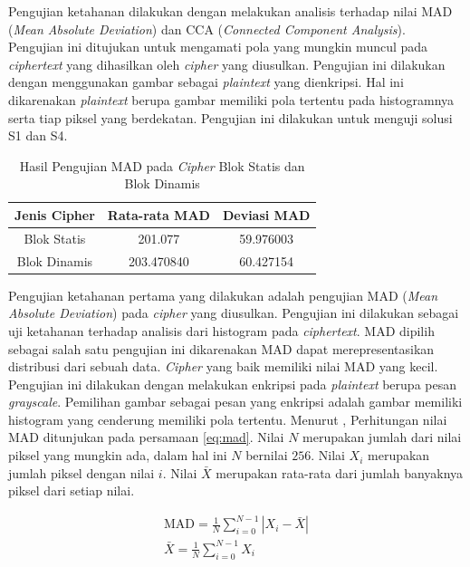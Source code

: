 Pengujian ketahanan dilakukan dengan melakukan analisis terhadap nilai MAD (\emph{Mean Absolute Deviation}) dan CCA (\emph{Connected Component Analysis}). Pengujian ini ditujukan untuk mengamati pola yang mungkin muncul pada \emph{ciphertext} yang dihasilkan oleh \emph{cipher} yang diusulkan. Pengujian ini dilakukan dengan menggunakan gambar sebagai \emph{plaintext} yang dienkripsi. Hal ini dikarenakan \emph{plaintext} berupa gambar memiliki pola tertentu pada histogramnya serta tiap piksel yang berdekatan. Pengujian ini dilakukan untuk menguji solusi S1 dan S4. 

\begin{table}[!h]
  \centering
  \caption{Hasil Pengujian MAD pada \emph{Cipher} Blok Statis dan Blok Dinamis} \label{tab:test.mad}
  \begin{tabular}{|c|c|c|}
    \hline
    \textbf{Jenis Cipher} & \textbf{Rata-rata MAD} & \textbf{Deviasi MAD} \\ \hline
    Blok Statis & 201.077 & 59.976003 \\ \hline
    Blok Dinamis & 203.470840 & 60.427154 \\ \hline
  \end{tabular}
\end{table}

Pengujian ketahanan pertama yang dilakukan adalah pengujian MAD (\emph{Mean Absolute Deviation}) pada \emph{cipher} yang diusulkan. Pengujian ini dilakukan sebagai uji ketahanan terhadap analisis dari histogram pada \emph{ciphertext}. MAD dipilih sebagai salah satu pengujian ini dikarenakan MAD dapat merepresentasikan distribusi dari sebuah data. \emph{Cipher} yang baik memiliki nilai MAD yang kecil. Pengujian ini dilakukan dengan melakukan enkripsi pada \emph{plaintext} berupa pesan \emph{grayscale}. Pemilihan gambar sebagai pesan yang enkripsi adalah gambar memiliki histogram yang cenderung memiliki pola tertentu. Menurut \textcite{lin2021}, Perhitungan nilai MAD ditunjukan pada persamaan \ref{eq:mad}. Nilai $N$ merupakan jumlah dari nilai piksel yang mungkin ada, dalam hal ini $N$ bernilai $256$. Nilai $X_i$ merupakan jumlah piksel dengan nilai $i$. Nilai $\bar{X}$ merupakan rata-rata dari jumlah banyaknya piksel dari setiap nilai.

\begin{equation}
  \begin{array}{c}   
    \text{MAD} = \frac{1}{N} \sum_{i=0}^{N - 1} |X_i - \bar{X}| \\
    \bar{X} = \frac{1}{N} \sum_{i=0}^{N - 1} X_i
  \end{array}
  \label{eq:mad}
\end{equation}

